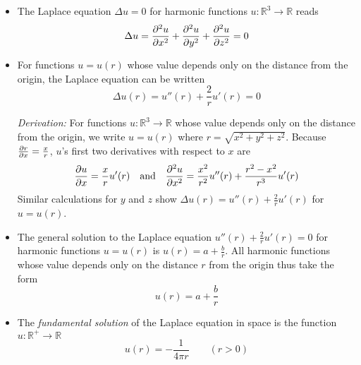 \documentclass[11pt, a4paper]{article}
\newcommand{\R}{\mathbb{R}} %
\begin{document}
\begin{itemize}
	\item The Laplace equation $ \Delta u = 0 $ for harmonic functions $ u : \R^3 \to \R $ reads
	\begin{equation*}
		\Delta u = \pdv[2]{u}{x} + \pdv[2]{u}{y} + \pdv[2]{u}{z} = 0
	\end{equation*}
	
	\item For functions $ u = u(r) $ whose value depends only on the distance from the origin, the Laplace equation can be written 
	\begin{equation*}
		\Delta u(r) = u''(r) + \frac{2}{r}u'(r) = 0 
	\end{equation*} 
	
	\textit{Derivation:} For functions $ u: \R^{3} \to \R $ whose value depends only on the distance from the origin, we write $ u = u(r) $ where  $ r = \sqrt{x^{2} + y^{2} + z^{2}} $. Because $ \pdv{r}{x} = \frac{x}{r} $, $ u $'s first two derivatives with respect to $ x $ are
	\begin{equation*}
		\pdv{u}{x} = \frac{x}{r}u'(r)  \quad \text{and} \quad \pdv[2]{u}{x} = \frac{x^{2}}{r^{2}} u''(r) + \frac{r^{2} - x^{2}}{r^{3}}u'(r)
	\end{equation*}
	Similar calculations for $ y $ and $ z $ show $ \Delta u(r)  = u''(r) + \frac{2}{r}u'(r)$ for $ u = u(r) $.
	
	\item The general solution to the Laplace equation $ u''(r) + \frac{2}{r}u'(r) = 0 $ for harmonic functions $ u = u(r) $ is $ u(r) = a + \frac{b}{r} $. All harmonic functions  whose value depends only on the distance $ r $ from the origin thus take the form
	\begin{equation*}
		 u(r) = a + \frac{b}{r}
	\end{equation*}

	
	
	\item The \textit{fundamental solution} of the Laplace equation in space is the function $ u : \R^+ \to \R $ 
	\begin{equation*}
		u(r) = -\frac{1}{4\pi r} \qquad (r > 0)
	\end{equation*}

\end{itemize}
\end{document}
